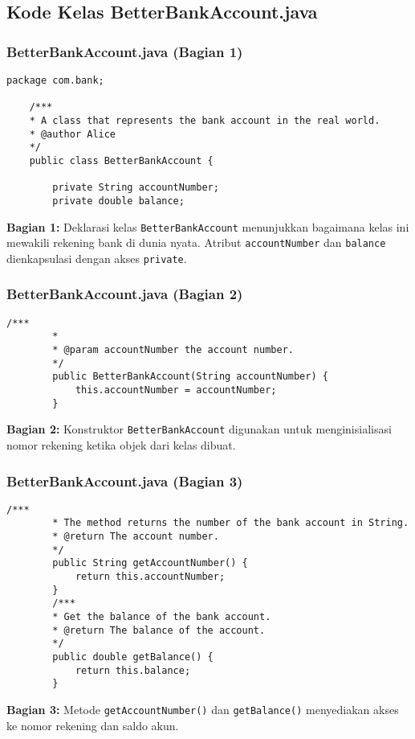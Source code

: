 \documentclass[aspectratio=169, table]{beamer}
\begin{document}
\subsection{Kode Kelas BetterBankAccount.java}

\begin{frame}[fragile]
\frametitle{BetterBankAccount.java (Bagian 1)}
\begin{lstlisting}[style=JavaStyle]
	package com.bank;
	
	/***
	* A class that represents the bank account in the real world.
	* @author Alice
	*/
	public class BetterBankAccount {
		
		private String accountNumber;
		private double balance;
	\end{lstlisting}
	\textbf{Bagian 1:} Deklarasi kelas \texttt{BetterBankAccount} menunjukkan bagaimana kelas ini mewakili rekening bank di dunia nyata. Atribut \texttt{accountNumber} dan \texttt{balance} dienkapsulasi dengan akses \texttt{private}.
\end{frame}

\begin{frame}[fragile]
	\frametitle{BetterBankAccount.java (Bagian 2)}
	\begin{lstlisting}[style=JavaStyle]
		/***
		* 
		* @param accountNumber the account number.
		*/
		public BetterBankAccount(String accountNumber) {
			this.accountNumber = accountNumber;
		}
	\end{lstlisting}
	\textbf{Bagian 2:} Konstruktor \texttt{BetterBankAccount} digunakan untuk menginisialisasi nomor rekening ketika objek dari kelas dibuat.
\end{frame}

\begin{frame}[fragile]
	\frametitle{BetterBankAccount.java (Bagian 3)}
	\begin{lstlisting}[style=JavaStyle]
		/***
		* The method returns the number of the bank account in String.
		* @return The account number.
		*/
		public String getAccountNumber() {
			return this.accountNumber;
		}
		/***
		* Get the balance of the bank account.
		* @return The balance of the account.
		*/
		public double getBalance() {
			return this.balance;
		}
	\end{lstlisting}
	\textbf{Bagian 3:} Metode \texttt{getAccountNumber()} dan \texttt{getBalance()} menyediakan akses ke nomor rekening dan saldo akun.
\end{frame}
\end{document}
